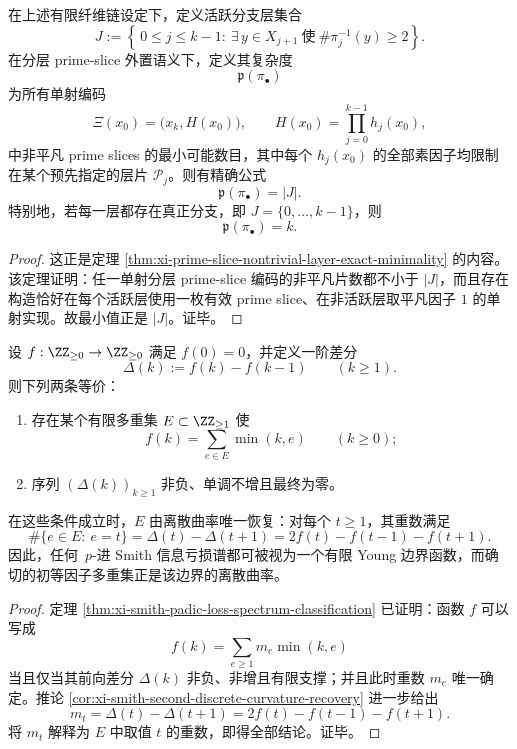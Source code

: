 \begin{theorem}[分层素数片复杂度的精确最优值等于活跃分支深度]\label{thm:xi-layered-primeslice-complexity-active-depth}
在上述有限纤维链设定下，定义活跃分支层集合
\[
J:=
\left\{
\,0\le j\le k-1:\ \exists\,y\in X_{j+1}\ \text{使}\ \#\pi_j^{-1}(y)\ge 2
\right\}.
\]
在分层 prime-slice 外置语义下，定义其复杂度
\[
\mathfrak p(\pi_\bullet)
\]
为所有单射编码
\[
\Xi(x_0)=\bigl(x_k,H(x_0)\bigr),
\qquad
H(x_0)=\prod_{j=0}^{k-1}h_j(x_0),
\]
中非平凡 prime slices 的最小可能数目，其中每个 \(h_j(x_0)\) 的全部素因子均限制在某个预先指定的层片 \(\mathcal P_j\)。则有精确公式
\[
\boxed{\;
\mathfrak p(\pi_\bullet)=|J|.\;}
\]
特别地，若每一层都存在真正分支，即 \(J=\{0,\dots,k-1\}\)，则
\[
\boxed{\;
\mathfrak p(\pi_\bullet)=k.\;}
\]
\end{theorem}
\begin{proof}
这正是定理 \ref{thm:xi-prime-slice-nontrivial-layer-exact-minimality} 的内容。该定理证明：任一单射分层 prime-slice 编码的非平凡片数都不小于 \(|J|\)，而且存在构造恰好在每个活跃层使用一枚有效 prime slice、在非活跃层取平凡因子 \(1\) 的单射实现。故最小值正是 \(|J|\)。证毕。
\end{proof}

\begin{theorem}\label{thm:xi-smith-loss-spectrum-discrete-curvature-complete-characterization}
设 \(f:\ZZ_{\ge 0}\to \ZZ_{\ge 0}\) 满足 \(f(0)=0\)，并定义一阶差分
\[
\Delta(k):=f(k)-f(k-1)\qquad(k\ge 1).
\]
则下列两条等价：
\begin{enumerate}
\item 存在某个有限多重集 \(E\subset \ZZ_{\ge 1}\) 使
\[
f(k)=\sum_{e\in E}\min(k,e)
\qquad(k\ge 0);
\]
\item 序列 \((\Delta(k))_{k\ge 1}\) 非负、单调不增且最终为零。
\end{enumerate}
在这些条件成立时，\(E\) 由离散曲率唯一恢复：对每个 \(t\ge 1\)，其重数满足
\[
\boxed{\;
\#\{e\in E:\ e=t\}
=
\Delta(t)-\Delta(t+1)
=
2f(t)-f(t-1)-f(t+1).\;}
\]
因此，任何 \(\,p\)-进 Smith 信息亏损谱都可被视为一个有限 Young 边界函数，而确切的初等因子多重集正是该边界的离散曲率。
\end{theorem}
\begin{proof}
定理 \ref{thm:xi-smith-padic-loss-spectrum-classification} 已证明：函数 \(f\) 可以写成
\[
f(k)=\sum_{e\ge 1}m_e\min(k,e)
\]
当且仅当其前向差分 \(\Delta(k)\) 非负、非增且有限支撑；并且此时重数 \(m_e\) 唯一确定。推论 \ref{cor:xi-smith-second-discrete-curvature-recovery} 进一步给出
\[
m_t=\Delta(t)-\Delta(t+1)=2f(t)-f(t-1)-f(t+1).
\]
将 \(m_t\) 解释为 \(E\) 中取值 \(t\) 的重数，即得全部结论。证毕。
\end{proof}

